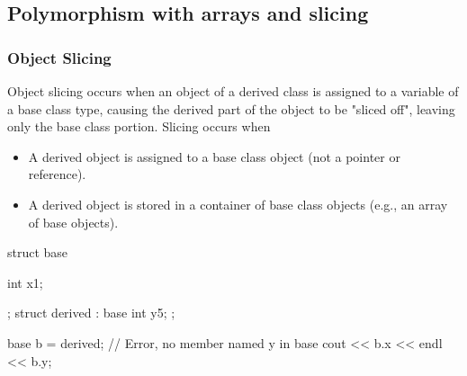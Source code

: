 \documentclass{report}
\begin{document}
    \bigbreak \noindent 
    \subsection{Polymorphism with arrays and slicing}
    \bigbreak \noindent 
    \subsubsection{Object Slicing}
    \bigbreak \noindent 
    Object slicing occurs when an object of a derived class is assigned to a variable of a base class type, causing the derived part of the object to be "sliced off", leaving only the base class portion.
    \bigbreak \noindent 
    Slicing occurs when 
    \begin{itemize}
        \item A derived object is assigned to a base class object (not a pointer or reference).
        \item A derived object is stored in a container of base class objects (e.g., an array of base objects).
    \end{itemize}
    \bigbreak \noindent 
    \begin{cppcode}
        struct base {
            int x{1};

        };
        struct derived : base {
            int y{5};
        };

        base b = derived{};
        // Error, no member named y in base
        cout << b.x << endl << b.y;
    \end{cppcode}

    \bigbreak \noindent 
\end{document}
